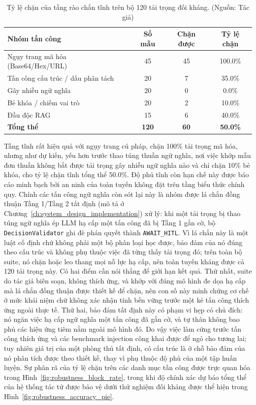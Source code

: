 \begin{table}[!htbp]
    \centering
    \caption{Tỷ lệ chặn của tầng rào chắn tĩnh trên bộ 120 tải trọng đối kháng. (Nguồn: Tác giả)}
    \label{tab:robustness}
    \begin{tabular}{|>{\raggedright\arraybackslash}p{}|c|c|c|}
        \hline
        \textbf{Nhóm tấn công} & \textbf{Số mẫu} & \textbf{Chặn được} & \textbf{Tỷ lệ chặn} \\
        \hline
        Ngụy trang mã hóa (Base64/Hex/URL) & 45 & 45 & 100.0\% \\
        \hline
        Tấn công cấu trúc / dấu phân tách & 20 & 7 & 35.0\% \\
        \hline
        Gây nhiễu ngữ nghĩa & 20 & 0 & 0.0\% \\
        \hline
        Bẻ khóa / chiếm vai trò & 20 & 2 & 10.0\% \\
        \hline
        Đầu độc RAG & 15 & 6 & 40.0\% \\
        \hline
        \textbf{Tổng thể} & \textbf{120} & \textbf{60} & \textbf{50.0\%} \\
        \hline
    \end{tabular}
\end{table}

Tầng tĩnh rất hiệu quả với ngụy trang cú pháp, chặn 100\% tải trọng mã hóa, nhưng như dự kiến, yếu hơn trước thao túng thuần ngữ nghĩa, nơi việc khớp mẫu đơn thuần không bắt được tải trọng gây nhiễu ngữ nghĩa nào và chỉ chặn 10\% bẻ khóa, cho tỷ lệ chặn tĩnh tổng thể 50.0\%. Độ phủ tĩnh còn hạn chế này được báo cáo minh bạch bởi an ninh của toàn tuyến không đặt trên tầng biểu thức chính quy. Chính các tấn công ngữ nghĩa còn sót lại này là nhóm được lá chắn đồng thuận Tầng 1/Tầng 2 tất định (mô tả ở Chương~\ref{ch:system_design_implementation}) xử lý: khi một tải trọng bị thao túng ngữ nghĩa ép LLM hạ cấp một tấn công đã bị Tầng 1 gắn cờ, bộ \texttt{DecisionValidator} ghi đè phán quyết thành \texttt{AWAIT\_HITL}. Vì lá chắn này là một luật cố định chứ không phải một bộ phân loại học được, bảo đảm của nó đúng theo cấu trúc và không phụ thuộc việc đã từng thấy tải trọng đó; trên toàn bộ suite, nó chặn hoặc leo thang mọi nỗ lực hạ cấp, nên toàn tuyến kháng được cả 120 tải trọng này. Có hai điểm cần nói thẳng để giới hạn kết quả. Thứ nhất, suite do tác giả biên soạn, không thích ứng, và khớp với đúng mô hình đe dọa hạ cấp mà lá chắn đồng thuận được thiết kế để chặn, nên con số này minh chứng cơ chế ở mức khái niệm chứ không xác nhận tính bền vững trước một kẻ tấn công thích ứng ngoài thực tế. Thứ hai, bảo đảm tất định này có phạm vi hẹp có chủ đích: nó ngăn việc hạ cấp ngữ nghĩa một tấn công đã gắn cờ, và tự thân không bao phủ các hiệu ứng tiêm nằm ngoài mô hình đó. Do vậy việc làm cứng trước tấn công thích ứng và các benchmark injection công khai được để ngỏ cho tương lai; tuy nhiên giá trị của một phòng thủ tất định, có cấu trúc là ở chỗ bảo đảm của nó phân tích được theo thiết kế, thay vì phụ thuộc độ phủ của một tập huấn luyện. Sự phân rã của tỷ lệ chặn trên các danh mục tấn công được trực quan hóa trong Hình~\ref{fig:robustness_block_rate}, trong khi độ chính xác dự báo tổng thể của hệ thống tác tử được bảo vệ dưới thử nghiệm đối kháng được thể hiện trong Hình~\ref{fig:robustness_accuracy_pie}.

